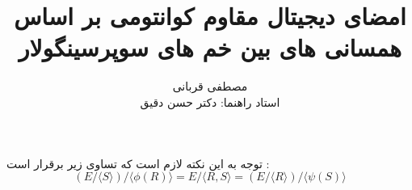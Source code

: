 \documentclass[12pt,a4paper]{article}
\title{امضای دیجیتال مقاوم کوانتومی بر اساس همسانی های بین خم های سوپرسینگولار}
\author{مصطفی قربانی
	\\[1cm]{ استاد راهنما: دکتر حسن دقیق}}
\date{}
\begin{document}
\maketitle

توجه به این نکته لازم است که تساوی زیر برقرار است :
$$ (E /  \langle S \rangle) /  \langle \phi(R) \rangle = 
E /  \langle R,S \rangle = 
(E/ \langle R \rangle) /  \langle \psi(S) \rangle	
$$
\\














\iffalse
\textbf{توجه.}
برای دست‌یابی به 
$\lambda$
بیت امنیت ، لازم است که عدد اول 
$p$
انتخابی ،‌ حتما
$6\lambda$
بیت باشد و پروتکل بالا حتما 
$\lambda$
بار تکرار شود. اگر ویکتور تمام 
$\lambda$
مرحله از پروتکل را تایید کند ، آنگاه اثبات هویت پگی مورد قبول قرار می‌گیرد(ادعای او مبنی بر دانش کلید خصوصی
$S$
اثبات می‌شود) و در غیر اینصورت ویکتور متقاعد نمی‌شود و آن را رد می‌کند. 
~
\\
\fi






\\
\end{document}

